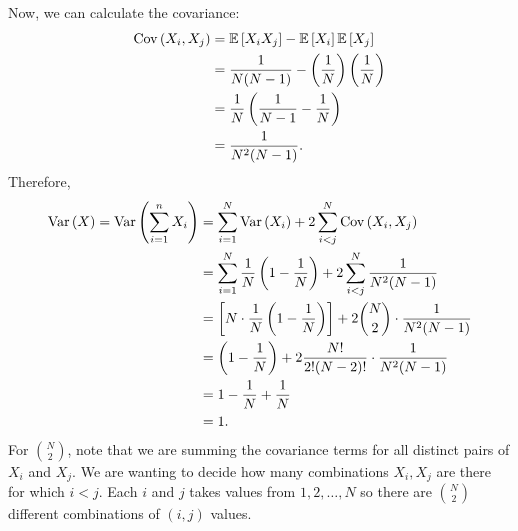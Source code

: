 \begin{example}
    Now, we can calculate the covariance:
    \begin{align*}
        \operatorname{Cov}\left({X_i,X_j}\right) &= \mathbb{E}\left[{X_i X_j}\right] - \mathbb{E}\left[{X_i}\right]\mathbb{E}\left[{X_j}\right] \\
        &= \frac{1}{N(N-1)} - \left( \frac{1}{N} \right) \left( \frac{1}{N} \right) \\
        &= \frac{1}{N} \left( \frac{1}{N-1} - \frac{1}{N} \right) \\
        &= \frac{1}{N^2 (N-1)}.
    \end{align*}
    Therefore,
    \begin{align*}
        \operatorname{Var}\left({X}\right) = \operatorname{Var}\left({\displaystyle \sum_{i=1}^{n} X_i}\right) &= \displaystyle \sum_{i=1}^{N} \operatorname{Var}\left({X_i}\right) + 2 \displaystyle \sum_{i < j}^{N} \operatorname{Cov}\left({X_i,X_j}\right) \\
        &= \displaystyle \sum_{i=1}^{N} \frac{1}{N} \left( 1 - \frac{1}{N} \right) + 2 \displaystyle \sum_{i<j}^{N} \frac{1}{N^2 (N-1)} \\
        &= \left[ N \cdot \frac{1}{N} \left( 1 - \frac{1}{N} \right) \right] + 2 \binom{N}{2} \cdot \frac{1}{N^2 (N-1)} \\
        &= \left( 1 - \frac{1}{N} \right) + 2 \frac{N!}{2! (N-2)!} \cdot \frac{1}{N^2 (N-1)} \\
        &= 1 - \frac{1}{N} + \frac{1}{N} \\
        &= 1.
    \end{align*}
    For $\binom{N}{2}$, note that we are summing the covariance terms for all distinct pairs of $X_i$ and $X_j$. We are wanting to decide how many combinations $X_i,X_j$ are there for which $i < j$. Each $i$ and $j$ takes values from $1,2,\ldots,N$ so there are $\binom{N}{2}$ different combinations of $(i,j)$ values.
\end{example}





\newpage